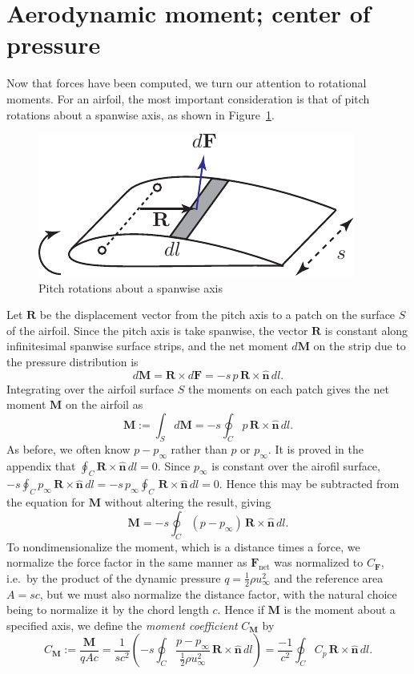 \documentclass[10pt,fleqn,reqno]{article}
\newcommand\ie{i.e.~}
\newcommand\defn[1]{\emph{#1}}
\newcommand\figref[1]{\mbox{Figure \ref{#1}}}
\begin{document}
\section{Aerodynamic moment; center of pressure}
Now that forces have been computed, we turn our attention to rotational moments.  For an airfoil, the most important consideration is that of pitch rotations about a spanwise axis, as shown in \figref{fig:moment}.
\begin{figure}[H]
\begin{center}
\includegraphics[scale=.8]{Figures/moment.pdf}
\caption{Pitch rotations about a spanwise axis}\label{fig:moment}
\end{center}
\end{figure}
Let $\mathbf R$ be the displacement vector from the pitch axis to a patch on the surface $S$ of the airfoil.  Since the pitch axis is take spanwise, the vector $\mathbf R$ is constant along infinitesimal spanwise surface strips, and the net moment $d\mathbf M$ on the strip due to the pressure distribution is \[d\mathbf M = \mathbf R\times d\mathbf F=-s\,p\,\mathbf R\times\hat{\mathbf n}\,dl.\]  Integrating over the airfoil surface $S$ the moments on each patch gives the net moment $\mathbf M$ on the airfoil as \[\mathbf M:=\int_Sd\mathbf M=-s\oint_C p\,\mathbf R\times\hat{\mathbf n}\,dl.\]  As before, we often know $p-p_\infty$ rather than $p$ or $p_\infty$.  It is proved in the appendix that $\oint_C\mathbf R\times\hat{\mathbf n}\,dl=0$.  Since $p_\infty$ is constant over the airofil surface, $-s\oint_Cp_\infty\,\mathbf R\times\hat{\mathbf n}\,dl=-s\,p_\infty\oint_C\,\mathbf R\times\hat{\mathbf n}\,dl=0$.  Hence this may be subtracted from the equation for $\mathbf M$ without altering the result, giving \[\mathbf M=-s\oint_C(p-p_\infty)\,\mathbf R\times\hat{\mathbf n}\,dl.\]  To nondimensionalize the moment, which is a distance times a force, we normalize the force factor in the same manner as $\mathbf F_\text{net}$ was normalized to $C_{\mathbf F}$, \ie by the product of the dynamic pressure $q=\frac{1}{2}\rho u_\infty^2$ and the reference area $A=sc$, but we must also normalize the distance factor, with the natural choice being to normalize it by the chord length $c$.  Hence if $\mathbf M$ is the moment about a specified axis, we define the \defn{moment coefficient} $C_{\mathbf M}$ by \[C_{\mathbf M}:=\frac{\mathbf M}{qAc}=\frac{1}{sc^2}\left(-s\oint_C\frac{p-p_\infty}{\frac{1}{2}\rho u_\infty^2}\,\mathbf R\times\hat{\mathbf n}\,dl\right)=\frac{-1}{c^2}\oint_CC_p\,\mathbf R\times\hat{\mathbf n}\,dl.\]
\end{document}
